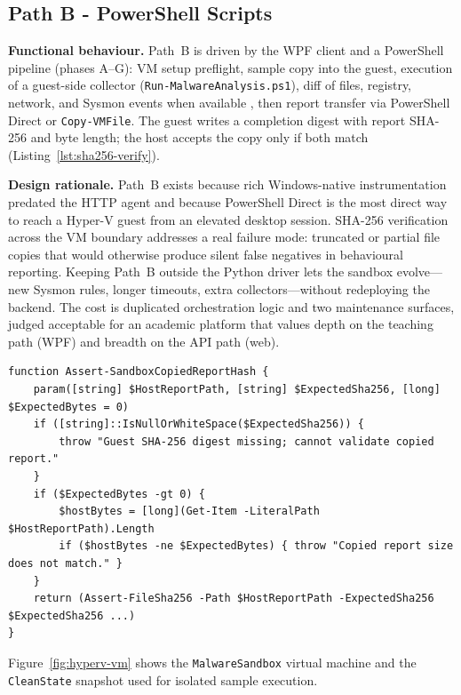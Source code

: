 \subsection{Path B - PowerShell Scripts}

\textbf{Functional behaviour.}
Path~B is driven by the WPF client and a PowerShell pipeline (phases A--G): VM setup preflight,
sample copy into the guest, execution of a guest-side collector (\texttt{Run-MalwareAnalysis.ps1}),
diff of files, registry, network, and Sysmon events when available \cite{sysmon2022}, then report
transfer via PowerShell Direct or \texttt{Copy-VMFile}. The guest writes a completion digest with
report SHA-256 and byte length; the host accepts the copy only if both match
(Listing~\ref{lst:sha256-verify}).

\textbf{Design rationale.}
Path~B exists because rich Windows-native instrumentation predated the HTTP agent and because
PowerShell Direct is the most direct way to reach a Hyper-V guest from an elevated desktop session.
SHA-256 verification across the VM boundary addresses a real failure mode: truncated or partial
file copies that would otherwise produce silent false negatives in behavioural reporting. Keeping
Path~B outside the Python driver lets the sandbox evolve---new Sysmon rules, longer timeouts,
extra collectors---without redeploying the backend. The cost is duplicated orchestration logic and
two maintenance surfaces, judged acceptable for an academic platform that values depth on the
teaching path (WPF) and breadth on the API path (web).

\begin{lstlisting}[style=powershell,caption={[Post-transfer SHA-256 verification]{Post-transfer SHA-256 verification --- \filepath{SandboxCommon/VmFileTransfer.ps1}}},label={lst:sha256-verify}]
function Assert-SandboxCopiedReportHash {
    param([string] $HostReportPath, [string] $ExpectedSha256, [long] $ExpectedBytes = 0)
    if ([string]::IsNullOrWhiteSpace($ExpectedSha256)) {
        throw "Guest SHA-256 digest missing; cannot validate copied report."
    }
    if ($ExpectedBytes -gt 0) {
        $hostBytes = [long](Get-Item -LiteralPath $HostReportPath).Length
        if ($hostBytes -ne $ExpectedBytes) { throw "Copied report size does not match." }
    }
    return (Assert-FileSha256 -Path $HostReportPath -ExpectedSha256 $ExpectedSha256 ...)
}
\end{lstlisting}

Figure~\ref{fig:hyperv-vm} shows the \texttt{MalwareSandbox} virtual machine and the
\texttt{CleanState} snapshot used for isolated sample execution.

